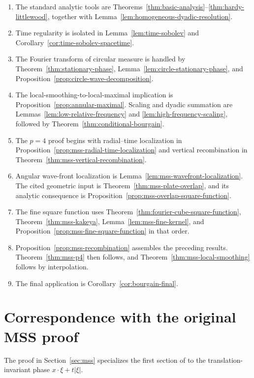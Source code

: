 \documentclass[11pt]{article}
\numberwithin{equation}{section}
\theoremstyle{definition}
\theoremstyle{remark}
\begin{document}
\begin{enumerate}[label=\arabic*.]
\item The standard analytic tools are Theorems~\ref{thm:basic-analysis}--\ref{thm:hardy-littlewood}, together with Lemma~\ref{lem:homogeneous-dyadic-resolution}.
\item Time regularity is isolated in Lemma~\ref{lem:time-sobolev} and Corollary~\ref{cor:time-sobolev-spacetime}.
\item The Fourier transform of circular measure is handled by Theorem~\ref{thm:stationary-phase}, Lemma~\ref{lem:circle-stationary-phase}, and Proposition~\ref{prop:circle-wave-decomposition}.
\item The local-smoothing-to-local-maximal implication is Proposition~\ref{prop:annular-maximal}.  Scaling and dyadic summation are Lemmas~\ref{lem:low-relative-frequency} and \ref{lem:high-frequency-scaling}, followed by Theorem~\ref{thm:conditional-bourgain}.
\item The $p=4$ proof begins with radial--time localization in Proposition~\ref{prop:mss-radial-time-localization} and vertical recombination in Theorem~\ref{thm:mss-vertical-recombination}.
\item Angular wave-front localization is Lemma~\ref{lem:mss-wavefront-localization}.  The cited geometric input is Theorem~\ref{thm:mss-plate-overlap}, and its analytic consequence is Proposition~\ref{prop:mss-overlap-square-function}.
\item The fine square function uses Theorem~\ref{thm:fourier-cube-square-function}, Theorem~\ref{thm:mss-kakeya}, Lemma~\ref{lem:mss-fine-kernel}, and Proposition~\ref{prop:mss-fine-square-function} in that order.
\item Proposition~\ref{prop:mss-recombination} assembles the preceding results.  Theorem~\ref{thm:mss-p4} then follows, and Theorem~\ref{thm:mss-local-smoothing} follows by interpolation.
\item The final application is Corollary~\ref{cor:bourgain-final}.
\end{enumerate}

\section{Correspondence with the original MSS proof}\label{sec:mss-correspondence}

The proof in Section~\ref{sec:mss} specializes the first section of \cite{MSS1992} to the translation-invariant phase $x\cdot\xi+t|\xi|$.
\end{document}
